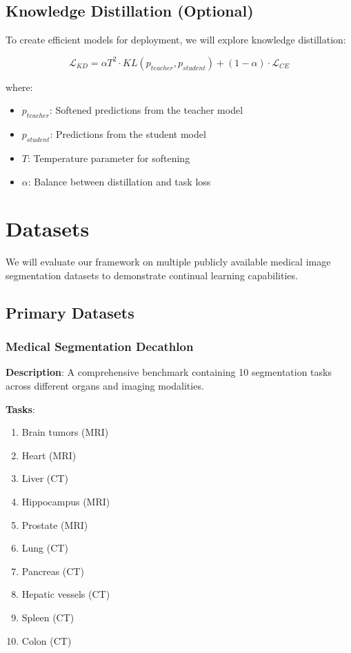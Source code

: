 \documentclass[conference]{IEEEtran}
\begin{document}
\subsection{Knowledge Distillation (Optional)}

To create efficient models for deployment, we will explore knowledge distillation:

\begin{equation}
\mathcal{L}_{KD} = \alpha T^2 \cdot KL(p_{teacher}, p_{student}) + (1-\alpha) \cdot \mathcal{L}_{CE}
\end{equation}

where:
\begin{itemize}
    \item $p_{teacher}$: Softened predictions from the teacher model
    \item $p_{student}$: Predictions from the student model
    \item $T$: Temperature parameter for softening
    \item $\alpha$: Balance between distillation and task loss
\end{itemize}

\section{Datasets}

We will evaluate our framework on multiple publicly available medical image segmentation datasets to demonstrate continual learning capabilities.

\subsection{Primary Datasets}

\subsubsection{Medical Segmentation Decathlon}

\textbf{Description}: A comprehensive benchmark containing 10 segmentation tasks across different organs and imaging modalities.

\textbf{Tasks}:
\begin{enumerate}
    \item Brain tumors (MRI)
    \item Heart (MRI)
    \item Liver (CT)
    \item Hippocampus (MRI)
    \item Prostate (MRI)
    \item Lung (CT)
    \item Pancreas (CT)
    \item Hepatic vessels (CT)
    \item Spleen (CT)
    \item Colon (CT)
\end{enumerate}
\end{document}
